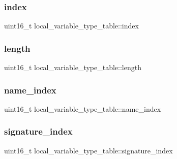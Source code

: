 \subsubsection{\texorpdfstring{index}{index}}
{\footnotesize\ttfamily uint16\+\_\+t local\+\_\+variable\+\_\+type\+\_\+table\+::index}

\hypertarget{structlocal__variable__type__table_ab4aec28dc62a86426d882d71fb7301c4}{}\label{structlocal__variable__type__table_ab4aec28dc62a86426d882d71fb7301c4} 
\subsubsection{\texorpdfstring{length}{length}}
{\footnotesize\ttfamily uint16\+\_\+t local\+\_\+variable\+\_\+type\+\_\+table\+::length}

\hypertarget{structlocal__variable__type__table_a85f7a2f12d9aef19590f878ee17503d9}{}\label{structlocal__variable__type__table_a85f7a2f12d9aef19590f878ee17503d9} 
\subsubsection{\texorpdfstring{name\+\_\+index}{name\_index}}
{\footnotesize\ttfamily uint16\+\_\+t local\+\_\+variable\+\_\+type\+\_\+table\+::name\+\_\+index}

\hypertarget{structlocal__variable__type__table_ae61ca0c68c0bd6aed2698eb51da60b17}{}\label{structlocal__variable__type__table_ae61ca0c68c0bd6aed2698eb51da60b17} 
\subsubsection{\texorpdfstring{signature\+\_\+index}{signature\_index}}
{\footnotesize\ttfamily uint16\+\_\+t local\+\_\+variable\+\_\+type\+\_\+table\+::signature\+\_\+index}

